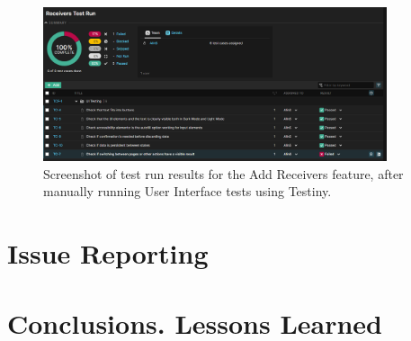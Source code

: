 \documentclass{article}
\begin{document}
\begin{figure}[htbp]
    \centering
    \includegraphics[width=0.9\textwidth]{./figures/testiny-receivers.png}
    \caption{Screenshot of test run results for the Add Receivers feature, after manually running User Interface tests using Testiny.}
    \label{FigReportTestinyReceivers}
\end{figure}

\section{Issue Reporting}

\section{Conclusions. Lessons Learned}

\newpage

\end{document}
